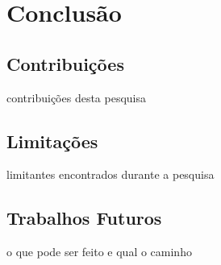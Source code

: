\chapter{Conclusão}
\label{sec:conclusao}
\pagestyle{plain}

\section{Contribuições}
contribuições desta pesquisa
\section{Limitações}
limitantes encontrados durante a pesquisa
\section{Trabalhos Futuros}

o que pode ser feito e qual o caminho




